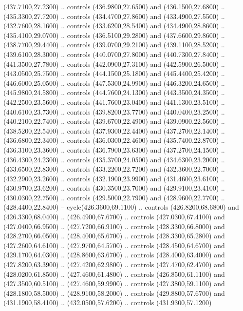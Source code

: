{\begin{scope}[y=0.80pt, x=0.80pt, yscale=-1, xscale=1, inner sep=0pt, outer sep=0pt, #1]
      (437.7100,27.2300) .. controls (436.9800,27.6500) and (436.1500,27.6800) ..
      (435.3300,27.7200) .. controls (434.4700,27.8600) and (433.4900,27.5500) ..
      (432.7600,28.1600) .. controls (433.6200,28.5400) and (434.4900,28.8600) ..
      (435.4100,29.0700) .. controls (436.5100,29.2800) and (437.6600,29.8600) ..
      (438.7700,29.4400) .. controls (439.0700,29.2100) and (439.1100,28.5200) ..
      (439.6100,28.3000) .. controls (440.0700,27.8000) and (440.7300,27.8400) ..
      (441.3500,27.7800) .. controls (442.0900,27.3100) and (442.5900,26.5000) ..
      (443.0500,25.7500) .. controls (444.1500,25.1800) and (445.4400,25.4200) ..
      (446.6000,25.0500) .. controls (447.5300,24.9900) and (446.3200,24.6500) ..
      (445.9800,24.5800) .. controls (444.7600,24.1300) and (443.3500,24.3500) ..
      (442.2500,23.5600) .. controls (441.7600,23.0400) and (441.1300,23.5100) ..
      (440.6100,23.7300) .. controls (439.8200,23.7700) and (440.0400,23.2500) ..
      (440.2100,22.7400) .. controls (439.6700,22.4900) and (439.0900,22.5600) ..
      (438.5200,22.5400) .. controls (437.9300,22.4400) and (437.2700,22.1400) ..
      (436.6800,22.3400) .. controls (436.0300,22.4600) and (435.7400,22.8700) ..
      (436.3100,23.3600) .. controls (436.7900,23.6300) and (437.2700,24.1500) ..
      (436.4300,24.2300) .. controls (435.3700,24.0500) and (434.6300,23.2000) ..
      (433.6500,22.8300) .. controls (433.2200,22.7200) and (432.3600,22.7000) ..
      (432.2900,23.2600) .. controls (432.1900,23.9900) and (431.4600,23.6100) ..
      (430.9700,23.6200) .. controls (430.3500,23.7000) and (429.9100,23.4100) ..
      (430.0300,22.7500) .. controls (429.5000,22.7900) and (428.9600,22.7700) ..
      (428.4400,22.8400) -- cycle(426.3600,69.1100) .. controls (426.8200,68.6800)
      and (426.3300,68.0400) .. (426.4900,67.6700) .. controls (427.0300,67.4100)
      and (427.0400,66.9500) .. (427.7200,66.9100) .. controls (428.3300,66.8000)
      and (428.2700,66.0500) .. (428.4000,65.6700) .. controls (428.3300,65.2800)
      and (427.2600,64.6100) .. (427.9700,64.5700) .. controls (428.4500,64.6700)
      and (429.1700,64.0300) .. (428.8600,63.6700) .. controls (428.4000,63.4000)
      and (427.8200,63.3900) .. (427.4200,62.9800) .. controls (427.4700,62.4700)
      and (428.0200,61.8500) .. (427.4600,61.4800) .. controls (426.8500,61.1100)
      and (427.3500,60.5100) .. (427.4600,59.9900) .. controls (427.3800,59.1100)
      and (428.1800,58.5000) .. (428.9100,58.2000) .. controls (429.8800,57.6700)
      and (431.1900,58.4100) .. (432.0500,57.6200) .. controls (431.9300,57.1200)

\end{scope}}
